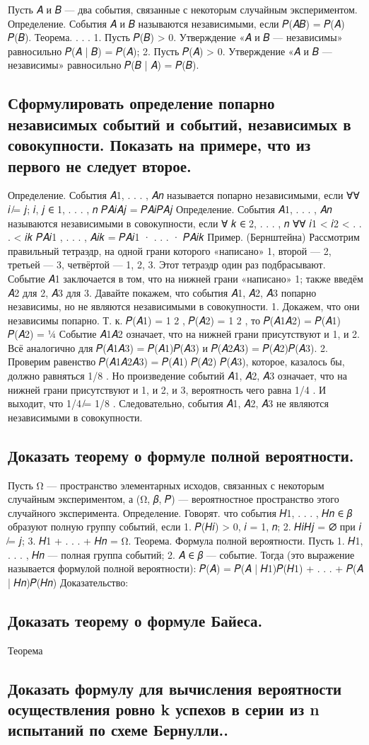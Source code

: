 Пусть 𝐴 и 𝐵 — два события, связанные с некоторым случайным экспериментом. 
Определение. События 𝐴 и 𝐵 называются независимыми, если 𝑃(𝐴𝐵) = 𝑃(𝐴) 𝑃(𝐵).
Теорема. . . . 
1. Пусть 𝑃(𝐵) > 0. Утверждение «𝐴 и 𝐵 — независимы» равносильно 𝑃(𝐴 | 𝐵) = 𝑃(𝐴); 
2. Пусть 𝑃(𝐴) > 0. Утверждение «𝐴 и 𝐵 — независимы» равносильно 𝑃(𝐵 | 𝐴) = 𝑃(𝐵).

\subsection{Сформулировать определение попарно независимых событий и событий, независимых в совокупности. Показать на примере, что из первого не следует второе.}

Определение. События 𝐴1, . . . , 𝐴𝑛 называется попарно независимыми, если
∀∀ 𝑖 ̸= 𝑗; 𝑖, 𝑗 ∈ {1, . . . , 𝑛} 𝑃{𝐴𝑖𝐴𝑗} = 𝑃{𝐴𝑖}𝑃{𝐴𝑗}
Определение. События 𝐴1, . . . , 𝐴𝑛 называются независимыми в совокупности, если
∀ 𝑘 ∈ {2, . . . , 𝑛} ∀∀ 𝑖1 < 𝑖2 < . . . < 𝑖𝑘 𝑃{𝐴𝑖1 , . . . , 𝐴𝑖𝑘 } = 𝑃{𝐴𝑖1 } · . . . · 𝑃{𝐴𝑖𝑘 }
Пример. (Бернштейна) 
Рассмотрим правильный тетраэдр, на одной грани которого «написано» 1, второй — 2, третьей — 3, четвёртой — 1, 2, 3.
Этот тетраэдр один раз подбрасывают. 
Событие 𝐴1 заключается в том, что на нижней грани «написано» 1; также введём 𝐴2 для 2, 𝐴3 для 3. Давайте покажем, что события 𝐴1, 𝐴2, 𝐴3 попарно независимы, но не являются независимыми в совокупности. 
1. Докажем, что они независимы попарно. Т. к. 𝑃(𝐴1) = 1 2 , 𝑃(𝐴2) = 1 2 , то
𝑃(𝐴1𝐴2) = 𝑃(𝐴1) 𝑃(𝐴2) = ¼
Событие 𝐴1𝐴2 означает, что на нижней грани присутствуют и 1, и 2. Всё аналогично для 𝑃(𝐴1𝐴3) = 𝑃(𝐴1)𝑃(𝐴3) и 𝑃(𝐴2𝐴3) = 𝑃(𝐴2)𝑃(𝐴3).
2. Проверим равенство 𝑃(𝐴1𝐴2𝐴3) = 𝑃(𝐴1) 𝑃(𝐴2) 𝑃(𝐴3), которое, казалось бы, должно равняться 1/8 . Но произведение событий 𝐴1, 𝐴2, 𝐴3 означает, что на нижней грани присутствуют и 1, и 2, и 3, вероятность чего равна 1/4 . И выходит, что 1/4 ̸= 1/8 .
Следовательно, события 𝐴1, 𝐴2, 𝐴3 не являются независимыми в совокупности.

\subsection{Доказать теорему о формуле полной вероятности.}

Пусть Ω — пространство элементарных исходов, связанных с некоторым случайным экспериментом, а (Ω, 𝛽, 𝑃) — вероятностное пространство этого случайного эксперимента.
Определение. Говорят. что события 𝐻1, . . . , 𝐻𝑛 ∈ 𝛽 образуют полную группу событий, если 
1. 𝑃(𝐻𝑖) > 0, 𝑖 = 1, 𝑛;
2. 𝐻𝑖𝐻𝑗 = ∅ при 𝑖 ̸= 𝑗; 
3. 𝐻1 + . . . + 𝐻𝑛 = Ω.
Теорема. Формула полной вероятности. Пусть 
1. 𝐻1, . . . , 𝐻𝑛 — полная группа событий; 
2. 𝐴 ∈ 𝛽 — событие. 
Тогда (это выражение называется формулой полной вероятности):
𝑃(𝐴) = 𝑃(𝐴 | 𝐻1)𝑃(𝐻1) + . . . + 𝑃(𝐴 | 𝐻𝑛)𝑃(𝐻𝑛)
Доказательство:

\subsection{Доказать теорему о формуле Байеса.}

Теорема

\subsection{Доказать формулу для вычисления вероятности осуществления ровно k успехов в серии из n испытаний по схеме Бернулли..}
